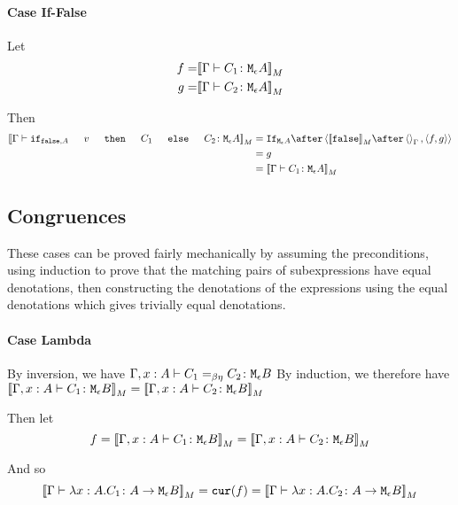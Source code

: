{    \paragraph{Case If-False}
    Let
    \begin{align}
        f = &{\bf [\![}\Gamma \vdash C_1 \colon \texttt{M}_{\epsilon}{A}{\bf ]\!]}_M\\
        g = &{\bf [\![}\Gamma \vdash C_2 \colon \texttt{M}_{\epsilon}{A}{\bf ]\!]}_M\\
    \end{align}

    Then
    \begin{equation}
        \begin{split}
            \deno{\gtyperelation{\ifthenelse{\f}{A}{v}{C_1}{C_2}}{\mea}} & = \ifnt{\mea}\after \pr{\deno{\f}\after\term{\G}}{\pr{f}{g}} \\
            & = g\\
            & = \deno{\gtyperelation{C_1}{\mea}}\\
        \end{split}
    \end{equation}



    \subsection{Congruences}
    These cases can be proved fairly mechanically by assuming the preconditions, using induction to prove that the matching pairs of subexpressions have equal denotations, then constructing the denotations of the expressions using the equal denotations which gives trivially equal denotations.

    \paragraph{Case Lambda}
        By inversion, we have $\Gamma, x: A \vdash C_1 =_{\beta\eta} C_2 \colon \texttt{M}_{\epsilon}{B}$
        By induction, we therefore have ${\bf [\![}\Gamma, x: A \vdash C_1 \colon \texttt{M}_{\epsilon}{B}{\bf ]\!]}_M = {\bf [\![}\Gamma, x: A \vdash C_2 \colon \texttt{M}_{\epsilon}{B}{\bf ]\!]}_M$

        Then let
        \begin{equation}
            f = {\bf [\![}\Gamma, x: A \vdash C_1 \colon \texttt{M}_{\epsilon}{B}{\bf ]\!]}_M = {\bf [\![}\Gamma, x: A \vdash C_2 \colon \texttt{M}_{\epsilon}{B}{\bf ]\!]}_M
        \end{equation}

        And so
        \begin{equation}
            {\bf [\![}\Gamma \vdash \lambda x : A. C_1 \colon A \rightarrow \texttt{M}_{\epsilon}{B}{\bf ]\!]}_M = \texttt{cur}(f) = {\bf [\![}\Gamma \vdash \lambda x : A. C_2 \colon A \rightarrow \texttt{M}_{\epsilon}{B}{\bf ]\!]}_M
        \end{equation}


}
